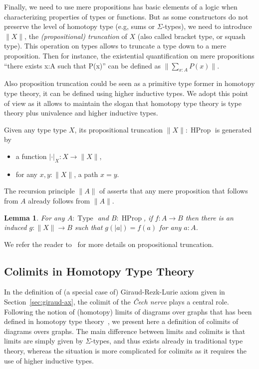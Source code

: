 \documentclass[conference]{IEEEtran}
\newtheorem{lem}[thm]{Lemma}
\newcommand{\eg}{e.g,\xspace}
\DeclareMathOperator{\Type}{Type}
\DeclareMathOperator{\HProp}{HProp}
\newcommand \squash[1] {\| #1 \| }
\begin{document}
Finally, we need to use mere propositions has basic elements of a logic
when characterizing properties of types or functions. 
%
But as some constructors do not preserve the level of homotopy type
(\eg sums or $\Sigma$-types), we need to introduce $\squash{X}$, the
{\em (propositional) truncation} of $X$ (also called bracket type, or
squash type). This operation on types allows to truncate a type down
to a mere proposition. Then for instance, the existential
quantification on mere propositions ``there exists x:A such that
P(x)'' can be defined as $ \squash{\sum_{x:A} P(x)}.  $

Also proposition truncation could be seen as a primitive type former
in homotopy type theory, it can be defined using higher inductive
types. We adopt this point of view as it allows to maintain the slogan
that homotopy type theory is type theory plus univalence and higher
inductive types.
%

Given any type type $X$, its propositional truncation 
$\squash{X} : \HProp$ is generated by 
\begin{itemize}
\item a function $|\cdot|_X : X \to \squash{X}$,
\item for any $x,y:\squash{X}$, a path $x=y$.
\end{itemize}
% 
The recursion principle $\squash{A}$ of asserts that any mere
proposition that follows from $A$ already follows from $\squash{A}$.
\begin{lem}
  For any $A:\Type$ and $B:\HProp$, if $f:A \to B$ then there is an
  induced $g:\squash{X}\to B$ such that $g(|a|)= f(a)$ for any $a:A$.
\end{lem}
%
We refer the reader to~\cite{hottbook} for more details on propositional truncation.

\subsection{Colimits in Homotopy Type Theory }
\label{sec:colim-homot-type}

In the definition of (a special case of) Giraud-Rezk-Lurie axiom given in
Section~\ref{sec:giraud-ax}, the colimit of the {\em \v{C}ech nerve}
plays a central role.
% 
Following the notion of (homotopy) limits of diagrams over graphs that
has been defined in homotopy type theory~\cite{lumsdaine}, we present
here a definition of colimits of diagrams overs graphs. 
%
The main difference between limits and colimits is that limits are
simply given by $\Sigma$-types, and thus exists already in traditional
type theory, whereas the situation is more complicated for colimits as
it requires the use of higher inductive types.
\end{document}
